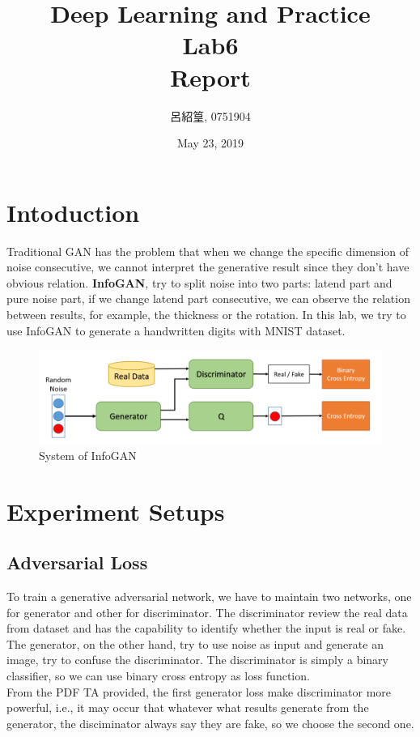 \documentclass[12pt,a4paper]{article}
\title{Deep Learning and Practice \\Lab6 \\ Report}
\date{May 23, 2019}
\author{呂紹篁, 0751904}
\begin{document}
\thispagestyle{plain}
\cfoot{}
\maketitle

\section{Intoduction} \label{sec:intro}
Traditional GAN has the problem that when we change the specific dimension of noise consecutive, we cannot interpret the generative result since they don't have obvious relation. \textbf{InfoGAN}, try to split noise into two parts: latend part and pure noise part, if we change latend part consecutive, we can observe the relation between results, for example, the thickness or the rotation. In this lab, we try to use InfoGAN to generate a handwritten digits with MNIST dataset.

\begin{figure}[hbt]
\centering
\includegraphics[scale=0.3]{infogan.png}
\caption{System of InfoGAN}
\label{fig:infogan}
\end{figure}

\section{Experiment Setups} \label{sec:exp_setup}
\subsection{Adversarial Loss}
To train a generative adversarial network, we have to maintain two networks, one for generator and other for discriminator. The discriminator review the real data from dataset and has the capability to identify whether the input is real or fake. The generator, on the other hand, try to use noise as input and generate an image, try to confuse the discriminator. The discriminator is simply a binary classifier, so we can use binary cross entropy as loss function. \\
From the PDF TA provided, the first generator loss make discriminator more powerful, i.e., it may occur that whatever what results generate from the generator, the disciminator always say they are fake, so we choose the second one. 
\end{document}

